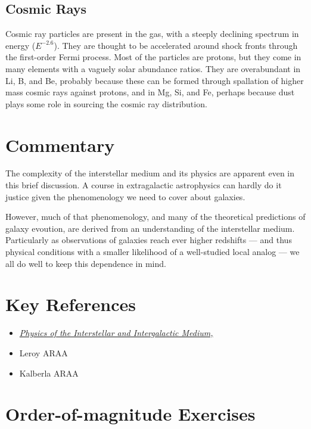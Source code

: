 \subsection{Cosmic Rays}

Cosmic ray particles are present in the gas, with a steeply declining
spectrum in energy ($E^{-2.6}$). They are thought to be accelerated
around shock fronts through the first-order Fermi process. Most of the
particles are protons, but they come in many elements with a vaguely
solar abundance ratios. They are overabundant in Li, B, and Be,
probably because these can be formed through spallation of higher mass
cosmic rays against protons, and in Mg, Si, and Fe, perhaps because
dust plays some role in sourcing the cosmic ray distribution.

\section{Commentary}

The complexity of the interstellar medium and its physics are apparent
even in this brief discussion. A course in extragalactic astrophysics
can hardly do it justice given the phenomenology we need to cover
about galaxies. 

However, much of that phenomenology, and many of the theoretical
predictions of galaxy evoution, are derived from an understanding of
the interstellar medium. Particularly as observations of galaxies
reach ever higher redshifts --- and thus physical conditions with a
smaller likelihood of a well-studied local analog --- we all do well
to keep this dependence in mind.

\section{Key References}

\begin{itemize}
  \item
    \href{http://}
    {\it Physics of the Interstellar and Intergalactic Medium,
      \citet{draine07a}}
\item Leroy ARAA
\item Kalberla ARAA
\end{itemize}

\section{Order-of-magnitude Exercises}

